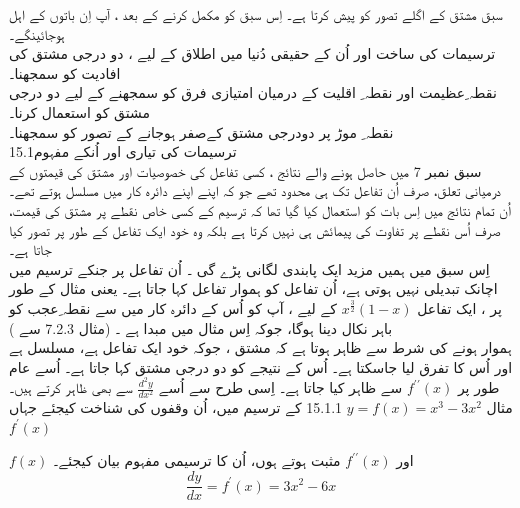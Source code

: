 سبق مشتق کے اگلے تصور کو پیش کرتا ہے۔ اِس سبق کو مکمل کرنے کے بعد ،    آپ اِن باتوں کے اہل ہوجائینگے۔\\
ترسیمات کی ساخت اور اُن کے حقیقی دُنیا میں اطلاق کے لیے ،  دو درجی   مشتق کی افادیت کو سمجھنا۔\\
نقطہ  ِعظیمت  اور نقطہ ِ اقلیت  کے درمیان امتیازی فرق کو سمجھنے کے لیے دو درجی مشتق کو استعمال کرنا۔\\
نقطہ  ِ موڑ   پر دودرجی مشتق کےصفر ہوجانے کے تصور کو سمجھنا۔ \\
 15.1ترسیمات کی تیاری اور اُنکے مفہوم\\
سبق نمبر 7  میں حاصل ہونے والے نتائج ،  کسی تفاعل کی خصوصیات اور مشتق کی قیمتوں کے درمیانی تعلق،  صرف اُن تفاعل تک ہی محدود تھے جو کہ اپنے اپنے دائرہ کار   میں مسلسل   ہوتے تھے۔   اُن تمام نتائج میں اِس بات کو استعمال کیا گیا تھا کہ ترسیم کے کسی خاص نقطے پر مشتق کی قیمت،   صرف اُس نقطے پر تفاوت    کی پیمائش ہی نہیں کرتا ہے بلکہ وہ خود ایک تفاعل کے طور پر تصور کیا جاتا ہے۔ \\
اِس سبق میں ہمیں مزید ایک پابندی لگانی پڑے گی ۔    اُن تفاعل پر جنکے ترسیم میں اچانک تبدیلی نہیں ہوتی ہے،    اُن تفاعل کو ہموار تفاعل    کہا  جاتا ہے۔   یعنی مثال کے طور پر ،   ایک تفاعل   
\(x^{\frac{3}{2}}\left(1-x\right) \)
کے لیے ،  آپ کو اُس کے دائرہ کار میں سے  نقطہ ِعجب       کو باہر نکال دینا ہوگا،  جوکہ اِس مثال میں مبدا ہے ۔  (مثال   7.2.3 سے )\\
ہموار ہونے کی شرط سے ظاہر ہوتا ہے کہ مشتق ،   جوکہ  خود ایک تفاعل ہے،  مسلسل ہے   اور اُس کا تفرق لیا جاسکتا ہے۔ اُس کے نتیجے کو  دو  درجی مشتق  کہا جاتا ہے۔    اُسے عام طور پر 
\(f^{\prime\prime}\left(x\right) \)
  سے ظاہر کیا جاتا ہے۔  اِسی طرح سے اُسے  
 \(\frac{d^{2}y}{dx^{2}} \)
   سے بھی ظاہر کرتے ہیں۔ \\
مثال   
\(y=f\left(x\right)=x^{3}-3x^{2} \)
   15.1.1     کے ترسیم میں،  اُن وقفوں کی شناخت کیجئے جہاں 
\(f^{\prime}\left(x\right) \)
   
\(f\left(x\right) \)
    اور 
\(f^{\prime\prime}\left(x\right) \)
     مثبت ہوتے ہوں،  اُن کا ترسیمی مفہوم بیان کیجئے۔ \\
\[\frac{dy}{dx}=f^{\prime}\left(x\right)=3x^{2}-6x \]

